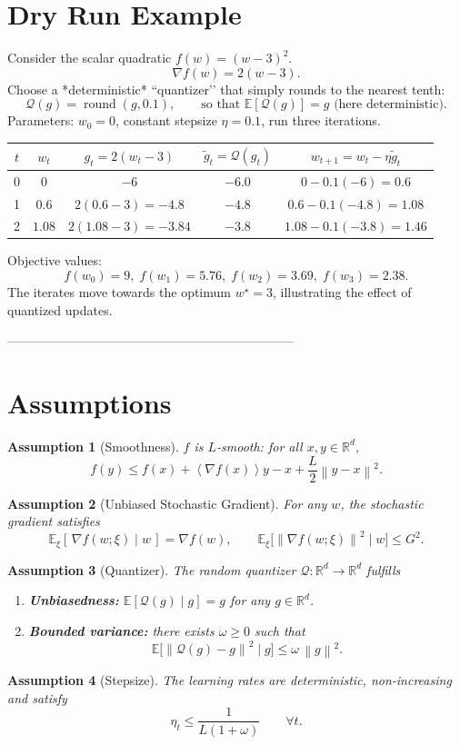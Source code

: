 \documentclass{article}
\newtheorem{assumption}{Assumption}
\newcommand{\E}{\mathbb{E}}
\newcommand{\norm}[1]{\left\|#1\right\|}
\newcommand{\inner}[1]{\left\langle #1\right\rangle}
\newcommand{\Q}{\mathcal{Q}}
\begin{document}
\section*{Dry Run Example}
Consider the scalar quadratic $f(w)=(w-3)^2$.
\[
\nabla f(w)=2(w-3).
\]
Choose a *deterministic* “quantizer’’ that simply rounds to the nearest tenth:
\[
\Q(g)=\operatorname{round}(g,0.1),\qquad\text{so that }\E[\Q(g)]=g\text{ (here deterministic).}
\]
Parameters: $w_0=0$, constant stepsize $\eta=0.1$, run three iterations.

\begin{center}
\begin{tabular}{c|c|c|c|c}
$t$ & $w_t$ & $g_t=2(w_t-3)$ & $\tilde g_t=\Q(g_t)$ & $w_{t+1}=w_t-\eta\tilde g_t$ \\ \hline
0 & $0$ & $-6$ & $-6.0$ & $0-0.1(-6)=0.6$ \\
1 & $0.6$ & $2(0.6-3)=-4.8$ & $-4.8$ & $0.6-0.1(-4.8)=1.08$ \\
2 & $1.08$ & $2(1.08-3)=-3.84$ & $-3.8$ & $1.08-0.1(-3.8)=1.46$ \\
\end{tabular}
\end{center}

Objective values:
\[
f(w_0)=9,\; f(w_1)=5.76,\; f(w_2)=3.69,\; f(w_3)=2.38.
\]
The iterates move towards the optimum $w^\star=3$, illustrating the effect of quantized updates.

--------------------------------------------------------------------

\section*{Assumptions}
\begin{assumption}[Smoothness]\label{ass:smooth}
$f$ is $L$‑smooth: for all $x,y\in\mathbb{R}^d$,
\[
f(y)\le f(x)+\inner{\nabla f(x)}{y-x}+\frac{L}{2}\norm{y-x}^2 .
\]
\end{assumption}
\begin{assumption}[Unbiased Stochastic Gradient]\label{ass:unbiased}
For any $w$, the stochastic gradient satisfies
\[
\E_{\xi}[\,\nabla f(w;\xi)\mid w\,]=\nabla f(w),\qquad
\E_{\xi}\!\big[\norm{\nabla f(w;\xi)}^2\mid w\big]\le G^2 .
\]
\end{assumption}
\begin{assumption}[Quantizer]\label{ass:quant}
The random quantizer $\Q:\mathbb{R}^d\to\mathbb{R}^d$ fulfills
\begin{enumerate}[label=(\roman*)]
\item \textbf{Unbiasedness:} $\E[\Q(g)\mid g]=g$ for any $g\in\mathbb{R}^d$.
\item \textbf{Bounded variance:} there exists $\omega\ge0$ such that
\[
\E\!\big[\norm{\Q(g)-g}^2\mid g\big]\le\omega\,\norm{g}^2 .
\]
\end{enumerate}
\end{assumption}
\begin{assumption}[Stepsize]\label{ass:stepsize}
The learning rates are deterministic, non‑increasing and satisfy
\[
\eta_t\le \frac{1}{L(1+\omega)}\qquad\forall t .
\]
\end{assumption}
\end{document}
